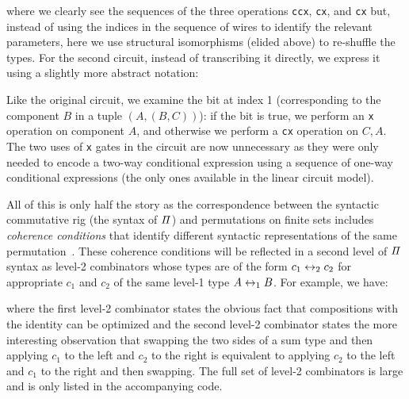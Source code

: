 \medskip

\adder{}

\noindent where we clearly see the sequences of the three operations \verb|ccx|, \verb|cx|, and \verb|cx| but, instead
of using the indices in the sequence of wires to identify the relevant parameters, here we use structural isomorphisms
(elided above) to re-shuffle the types. For the second circuit, instead of transcribing it directly, we express it using
a slightly more abstract notation:

\medskip

\resettwo{}

\noindent Like the original circuit, we examine the bit at index 1 (corresponding to the component $B$ in a tuple
$(A,(B,C))$): if the bit is true, we perform an \verb|x| operation on component $A$, and otherwise we perform a
\verb|cx| operation on $C,A$. The two uses of \verb|x| gates in the circuit are now unnecessary as they were only needed
to encode a two-way conditional expression using a sequence of one-way conditional expressions (the only ones available in
the linear circuit model).

All of this is only half the story as the correspondence between the syntactic commutative rig (the syntax of $\mathit{\Pi}$)
and permutations on finite sets includes \emph{coherence conditions} that identify different syntactic representations
of the same permutation~\cite{laplaza72,Carette2016}. These coherence conditions will be reflected in a second level of $\mathit{\Pi}$
syntax as level-2 combinators whose types are of the form $c_1 \leftrightarrow_2 c_2$ for appropriate $c_1$ and $c_2$ of the same
level-1 type $A \leftrightarrow_1 B$. For example, we have:

\medskip

\combtwo{}

\noindent where the first level-2 combinator states the obvious fact that compositions with the identity can be
optimized and the second level-2 combinator states the more interesting observation that swapping the two sides of a sum
type and then applying $c_1$ to the left and $c_2$ to the right is equivalent to applying $c_2$ to the left and $c_1$ to
the right and then swapping. The full set of level-2 combinators is large and is only listed in the accompanying code.


